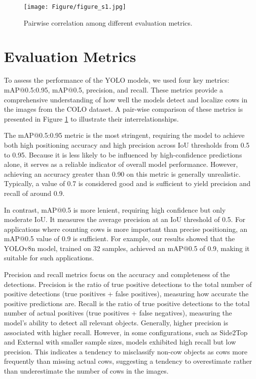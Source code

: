 \begin{figure}[h]
    \centering
    \texttt{[image: Figure/figure\_s1.jpg]}
    \caption{Pairwise correlation among different evaluation metrics.}
    \label{fig:metrics}
\end{figure}


\section{Evaluation Metrics}

To assess the performance of the YOLO models, we used four key metrics: mAP@0.5:0.95, mAP@0.5, precision, and recall. These metrics provide a comprehensive understanding of how well the models detect and localize cows in the images from the COLO dataset. A pair-wise comparison of these metrics is presented in Figure \ref{fig:metrics} to illustrate their interrelationships.

The mAP@0.5:0.95 metric is the most stringent, requiring the model to achieve both high positioning accuracy and high precision across IoU thresholds from 0.5 to 0.95. Because it is less likely to be influenced by high-confidence predictions alone, it serves as a reliable indicator of overall model performance. However, achieving an accuracy greater than 0.90 on this metric is generally unrealistic. Typically, a value of 0.7 is considered good and is sufficient to yield precision and recall of around 0.9.

In contrast, mAP@0.5 is more lenient, requiring high confidence but only moderate IoU. It measures the average precision at an IoU threshold of 0.5. For applications where counting cows is more important than precise positioning, an mAP@0.5 value of 0.9 is sufficient. For example, our results showed that the YOLOv8n model, trained on 32 samples, achieved an mAP@0.5 of 0.9, making it suitable for such applications.

Precision and recall metrics focus on the accuracy and completeness of the detections. Precision is the ratio of true positive detections to the total number of positive detections (true positives + false positives), measuring how accurate the positive predictions are. Recall is the ratio of true positive detections to the total number of actual positives (true positives + false negatives), measuring the model’s ability to detect all relevant objects. Generally, higher precision is associated with higher recall. However, in some configurations, such as Side2Top and External with smaller sample sizes, models exhibited high recall but low precision. This indicates a tendency to misclassify non-cow objects as cows more frequently than missing actual cows, suggesting a tendency to overestimate rather than underestimate the number of cows in the images.

